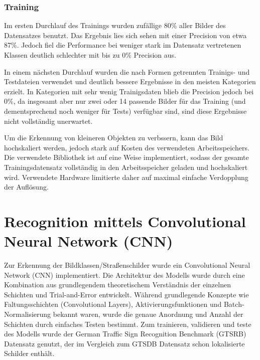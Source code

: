 \documentclass[runningheads]{llncs}
\begin{document}
\subsubsection{Training}
Im ersten Durchlauf des Trainings wurden zufällige 80\% aller Bilder des Datensatzes benutzt. Das Ergebnis lies sich sehen mit einer Precision von etwa 87\%. Jedoch fiel die Performance bei weniger stark im Datensatz vertretenen Klassen deutlich schlechter mit bis zu 0\% Precision aus.

In einem nächsten Durchlauf wurden die nach Formen getrennten Trainigs- und Testdateien verwendet und deutlich bessere Ergebnisse in den meisten Kategorien erzielt. In Kategorien mit sehr wenig Trainigsdaten blieb die Precision jedoch bei 0\%, da insgesamt aber nur zwei oder 14 passende Bilder für das Training (und dementsprechend noch weniger für Tests) verfügbar sind, sind diese Ergebnisse nicht vollständig unerwartet.

Um die Erkennung von kleineren Objekten zu verbssern, kann das Bild hochskaliert werden, jedoch stark auf Kosten des verwendeten Arbeitsspeichers. Die verwendete Bibliothek ist auf eine Weise implementiert, sodass der gesamte Trainingsdatensatz vollständig in den Arbeitsspeicher geladen und hochskaliert wird. Verwendete Hardware limitierte daher auf maximal einfache Verdopplung der Auflösung.

\section{Recognition mittels Convolutional Neural Network (CNN)}
Zur Erkennung der Bildklassen/Straßenschilder wurde ein Convolutional Neural Network (CNN) implementiert. Die Architektur des Modells wurde
durch eine Kombination aus grundlegendem theoretischem Verständnis der einzelnen Schichten und Trial-and-Error entwickelt.
Während grundlegende Konzepte wie Faltungsschichten (Convolutional Layers), Aktivierungsfunktionen und Batch-Normalisierung
bekannt waren, wurde die genaue Anordnung und Anzahl der Schichten durch einfaches Testen bestimmt.
Zum trainieren, validieren und teste des Modells wurde der German Traffic Sign Recognition Benchmark (GTSRB) Datensatz genutzt, der
im Vergleich zum GTSDB Datensatz schon lokalisierte Schilder enthält.
\end{document}
